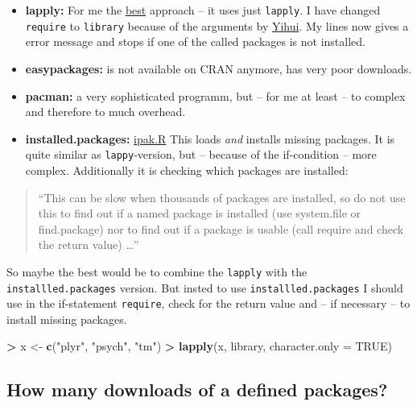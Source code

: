 \documentclass[]{book}
\newenvironment{Shaded}{\begin{snugshade}}{\end{snugshade}}
\newcommand{\KeywordTok}[1]{\textcolor[rgb]{0.13,0.29,0.53}{\textbf{#1}}}
\newcommand{\DataTypeTok}[1]{\textcolor[rgb]{0.13,0.29,0.53}{#1}}
\newcommand{\StringTok}[1]{\textcolor[rgb]{0.31,0.60,0.02}{#1}}
\newcommand{\OtherTok}[1]{\textcolor[rgb]{0.56,0.35,0.01}{#1}}
\newcommand{\OperatorTok}[1]{\textcolor[rgb]{0.81,0.36,0.00}{\textbf{#1}}}
\newcommand{\NormalTok}[1]{#1}
\providecommand{\tightlist}{%
  \setlength{\itemsep}{0pt}\setlength{\parskip}{0pt}}
\theoremstyle{definition}
\theoremstyle{definition}
\theoremstyle{definition}
\theoremstyle{remark}
\begin{document}
\begin{itemize}
\tightlist
\item
  \textbf{lapply:} For me the
  \href{https://stackoverflow.com/questions/8175912/load-multiple-packages-at-once}{best}
  approach -- it uses just \texttt{lapply}. I have changed
  \texttt{require} to \texttt{library} because of the arguments by
  \href{https://yihui.name/en/2014/07/library-vs-require/}{Yihui}. My
  lines now gives a error message and stops if one of the called
  packages is not installed.
\item
  \textbf{easypackages:} is not available on CRAN anymore, has very poor
  downloads.
\item
  \textbf{pacman:} a very sophisticated programm, but -- for me at least
  -- to complex and therefore to much overhead.
\item
  \textbf{installed.packages:}
  \href{https://gist.github.com/stevenworthington/3178163}{ipak.R} This
  loads \emph{and} installs missing packages. It is quite similar as
  \texttt{lappy}-version, but -- because of the if-condition -- more
  complex. Additionally it is checking which packages are installed:
\end{itemize}

\begin{quote}
``This can be slow when thousands of packages are installed, so do not
use this to find out if a named package is installed (use system.file or
find.package) nor to find out if a package is usable (call require and
check the return value) \ldots{}''
\end{quote}

So maybe the best would be to combine the \texttt{lapply} with the
\texttt{installled.packages} version. But insted to use
\texttt{installled.packages} I should use in the if-statement
\texttt{require}, check for the return value and -- if necessary -- to
install missing packages.

\begin{Shaded}
\begin{Highlighting}[]
\OperatorTok{>}\StringTok{ }\NormalTok{x <-}\StringTok{ }\KeywordTok{c}\NormalTok{(}\StringTok{"plyr"}\NormalTok{, }\StringTok{"psych"}\NormalTok{, }\StringTok{"tm"}\NormalTok{)}
\OperatorTok{>}\StringTok{ }\KeywordTok{lapply}\NormalTok{(x, library, }\DataTypeTok{character.only =} \OtherTok{TRUE}\NormalTok{)}
\end{Highlighting}
\end{Shaded}

\subsection{How many downloads of a defined
packages?}\label{how-many-downloads-of-a-defined-packages}
\end{document}
